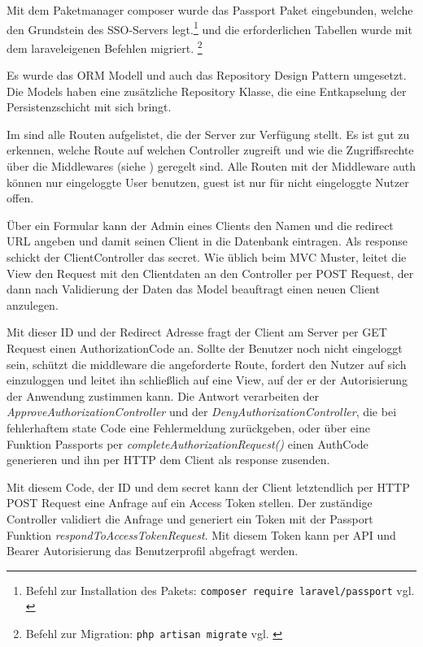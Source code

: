 Mit dem Paketmanager composer wurde das Passport Paket eingebunden, welche den Grundstein des SSO-Servers legt.\footnote{Befehl zur Installation des Pakets: \texttt{composer require laravel/passport} vgl. \cite{composer}} und die erforderlichen Tabellen wurde mit dem laraveleigenen Befehlen migriert. \footnote{Befehl zur Migration: \texttt{php artisan migrate} vgl. \cite{Laravel}}

Es wurde das ORM Modell und auch das Repository Design Pattern umgesetzt. Die Models haben eine zusätzliche  Repository Klasse, die eine Entkapselung der Persistenzschicht mit sich bringt.

Im  sind alle Routen aufgelistet, die der Server zur Verfügung stellt. Es ist gut zu erkennen, welche Route auf welchen Controller zugreift und wie die Zugriffsrechte über die Middlewares (siehe ) geregelt sind. Alle Routen mit der Middleware auth können nur eingeloggte User benutzen, guest ist nur für nicht eingeloggte Nutzer offen.

Über ein Formular kann der Admin eines Clients den Namen und die redirect URL angeben und damit seinen Client in die Datenbank eintragen. Als response schickt der ClientController das secret.
Wie üblich beim MVC Muster, leitet die View den Request mit den Clientdaten an den Controller per POST Request, der dann nach Validierung der Daten das Model beauftragt einen neuen Client anzulegen. 

Mit dieser ID und der Redirect Adresse fragt der Client am Server per GET Request einen AuthorizationCode an. Sollte der Benutzer noch nicht eingeloggt sein, schützt die middleware die angeforderte Route, fordert den Nutzer auf sich einzuloggen und leitet ihn schließlich auf eine View, auf der er der Autorisierung der Anwendung zustimmen kann. Die Antwort verarbeiten der \textit{ApproveAuthorizationController} und der \textit{DenyAuthorizationController}, die bei fehlerhaftem state Code eine Fehlermeldung zurückgeben, oder über eine Funktion Passports per \textit{completeAuthorizationRequest()} einen AuthCode generieren und ihn per HTTP dem Client als response zusenden.

Mit diesem Code, der ID und dem secret kann der Client letztendlich per HTTP POST Request eine Anfrage auf ein Access Token stellen. Der zuständige Controller validiert die Anfrage und generiert ein Token mit der Passport Funktion \textit{respondToAccessTokenRequest}. Mit diesem Token kann per API und Bearer Autorisierung das Benutzerprofil abgefragt werden.

